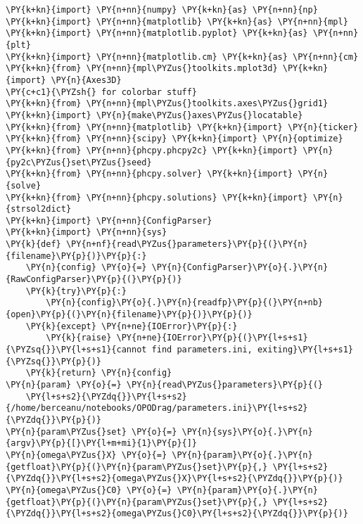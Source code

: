 

\begin{Verbatim}[commandchars=\\\{\}]
\PY{k+kn}{import} \PY{n+nn}{numpy} \PY{k+kn}{as} \PY{n+nn}{np}
\PY{k+kn}{import} \PY{n+nn}{matplotlib} \PY{k+kn}{as} \PY{n+nn}{mpl}
\PY{k+kn}{import} \PY{n+nn}{matplotlib.pyplot} \PY{k+kn}{as} \PY{n+nn}{plt}
\PY{k+kn}{import} \PY{n+nn}{matplotlib.cm} \PY{k+kn}{as} \PY{n+nn}{cm}
\PY{k+kn}{from} \PY{n+nn}{mpl\PYZus{}toolkits.mplot3d} \PY{k+kn}{import} \PY{n}{Axes3D}
\PY{c+c1}{\PYZsh{} for colorbar stuff}
\PY{k+kn}{from} \PY{n+nn}{mpl\PYZus{}toolkits.axes\PYZus{}grid1} \PY{k+kn}{import} \PY{n}{make\PYZus{}axes\PYZus{}locatable}
\PY{k+kn}{from} \PY{n+nn}{matplotlib} \PY{k+kn}{import} \PY{n}{ticker}
\PY{k+kn}{from} \PY{n+nn}{scipy} \PY{k+kn}{import} \PY{n}{optimize}
\PY{k+kn}{from} \PY{n+nn}{phcpy.phcpy2c} \PY{k+kn}{import} \PY{n}{py2c\PYZus{}set\PYZus{}seed}
\PY{k+kn}{from} \PY{n+nn}{phcpy.solver} \PY{k+kn}{import} \PY{n}{solve}
\PY{k+kn}{from} \PY{n+nn}{phcpy.solutions} \PY{k+kn}{import} \PY{n}{strsol2dict}
\PY{k+kn}{import} \PY{n+nn}{ConfigParser}
\PY{k+kn}{import} \PY{n+nn}{sys}
\PY{k}{def} \PY{n+nf}{read\PYZus{}parameters}\PY{p}{(}\PY{n}{filename}\PY{p}{)}\PY{p}{:}
    \PY{n}{config} \PY{o}{=} \PY{n}{ConfigParser}\PY{o}{.}\PY{n}{RawConfigParser}\PY{p}{(}\PY{p}{)}
    \PY{k}{try}\PY{p}{:}
        \PY{n}{config}\PY{o}{.}\PY{n}{readfp}\PY{p}{(}\PY{n+nb}{open}\PY{p}{(}\PY{n}{filename}\PY{p}{)}\PY{p}{)}
    \PY{k}{except} \PY{n+ne}{IOError}\PY{p}{:}
        \PY{k}{raise} \PY{n+ne}{IOError}\PY{p}{(}\PY{l+s+s1}{\PYZsq{}}\PY{l+s+s1}{cannot find parameters.ini, exiting}\PY{l+s+s1}{\PYZsq{}}\PY{p}{)}
    \PY{k}{return} \PY{n}{config}
\PY{n}{param} \PY{o}{=} \PY{n}{read\PYZus{}parameters}\PY{p}{(}
    \PY{l+s+s2}{\PYZdq{}}\PY{l+s+s2}{/home/berceanu/notebooks/OPODrag/parameters.ini}\PY{l+s+s2}{\PYZdq{}}\PY{p}{)}
\PY{n}{param\PYZus{}set} \PY{o}{=} \PY{n}{sys}\PY{o}{.}\PY{n}{argv}\PY{p}{[}\PY{l+m+mi}{1}\PY{p}{]}
\PY{n}{omega\PYZus{}X} \PY{o}{=} \PY{n}{param}\PY{o}{.}\PY{n}{getfloat}\PY{p}{(}\PY{n}{param\PYZus{}set}\PY{p}{,} \PY{l+s+s2}{\PYZdq{}}\PY{l+s+s2}{omega\PYZus{}X}\PY{l+s+s2}{\PYZdq{}}\PY{p}{)}
\PY{n}{omega\PYZus{}C0} \PY{o}{=} \PY{n}{param}\PY{o}{.}\PY{n}{getfloat}\PY{p}{(}\PY{n}{param\PYZus{}set}\PY{p}{,} \PY{l+s+s2}{\PYZdq{}}\PY{l+s+s2}{omega\PYZus{}C0}\PY{l+s+s2}{\PYZdq{}}\PY{p}{)}

\end{Verbatim}
